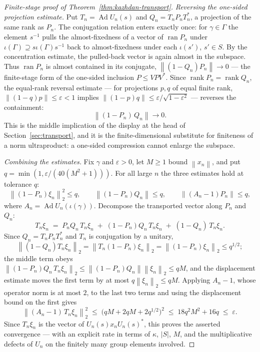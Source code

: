 \documentclass[11pt]{amsart}
\theoremstyle{definition}
\theoremstyle{remark}
\theoremstyle{plain}
\newcommand{\Ad}{\operatorname{Ad}}
\newcommand{\opnorm}[1]{\left\lVert #1\right\rVert}
\newcommand{\hsnorm}[1]{\left\lVert #1\right\rVert_{2}}
\begin{document}
\begin{proof}[Finite-stage proof of Theorem~\ref{thm:kazhdan-transport}]
\emph{Reversing the one-sided projection estimate.}  Put
$T_n=\Ad U_n(s)$ and $Q_n=T_nP_nT_n^*$, a projection of the same rank as
$P_n$.  The conjugation relation enters exactly once: for
$\gamma\in\Gamma$ the element $s^{-1}$ pulls the almost-fixedness of a
vector of $\operatorname{ran}P_n$ under
$\iota(\Gamma)\supseteq s\iota(\Gamma)s^{-1}$ back to
almost-fixedness under each $\iota(s')$, $s'\in S$.  By the
concentration estimate, the pulled-back vector is again almost in the
subspace.  Thus
$\operatorname{ran}P_n$ is almost contained in its conjugate,
$\opnorm{(1-Q_n)P_n}\to0$ --- the finite-stage form of the one-sided
inclusion $P\le VPV^*$.  Since $\operatorname{rank}P_n=
\operatorname{rank}Q_n$, the equal-rank reversal estimate --- for projections $p,q$ of
equal finite rank, $\opnorm{(1-q)p}\le\varepsilon<1$ implies
$\opnorm{(1-p)q}\le\varepsilon/\sqrt{1-\varepsilon^2}$ --- reverses the
containment:
\[
 \opnorm{(1-P_n)\,Q_n}\longrightarrow0.
\]
This is the middle implication of the display at the head of
Section~\ref{sec:transport}, and it is the finite-dimensional
substitute for finiteness of a norm ultraproduct: a one-sided
compression cannot enlarge the subspace.

\emph{Combining the estimates.}  Fix $\gamma$ and $\varepsilon>0$, let $M\ge1$ bound
$\opnorm{x_n}$, and put $q=\min(1,\varepsilon/(40(M^2+1)))$.  For all
large $n$ the three estimates hold at tolerance $q$:
\[
 \hsnorm{(1-P_n)\xi_n}^2\le q,\qquad
 \opnorm{(1-P_n)Q_n}\le q,\qquad
 \opnorm{(A_n-1)P_n}\le q,
\]
where $A_n=\Ad U_n(\iota(\gamma))$.  Decompose the transported vector
along $P_n$ and $Q_n$:
\[
 T_n\xi_n\;=\;P_nQ_n\,T_n\xi_n\;+\;(1-P_n)Q_n\,T_n\xi_n
 \;+\;(1-Q_n)\,T_n\xi_n.
\]
Since $Q_n=T_nP_nT_n^*$ and $T_n$ is conjugation by a unitary,
\[
 \hsnorm{(1-Q_n)T_n\xi_n}=\hsnorm{T_n(1-P_n)\xi_n}
 =\hsnorm{(1-P_n)\xi_n}\le q^{1/2};
\]
the middle term obeys
$\hsnorm{(1-P_n)Q_n\,T_n\xi_n}\le\opnorm{(1-P_n)Q_n}\hsnorm{\xi_n}
\le qM$, and the displacement estimate moves the first term by at most
$q\hsnorm{\xi_n}\le qM$.  Applying $A_n-1$, whose operator norm is at
most $2$, to the last two terms and using the displacement bound on
the first gives
\[
 \hsnorm{(A_n-1)\,T_n\xi_n}^2
 \;\le\;\bigl(qM+2qM+2q^{1/2}\bigr)^2
 \;\le\;18q^2M^2+16q\;\le\;\varepsilon.
\]
Since $T_n\xi_n$ is the vector of $U_n(s)x_nU_n(s)^*$, this proves the
asserted convergence --- with an explicit rate in terms of $\kappa$,
$|S|$, $M$, and the multiplicative defects of $U_n$ on the finitely many
group elements involved.
\end{proof}
\end{document}
